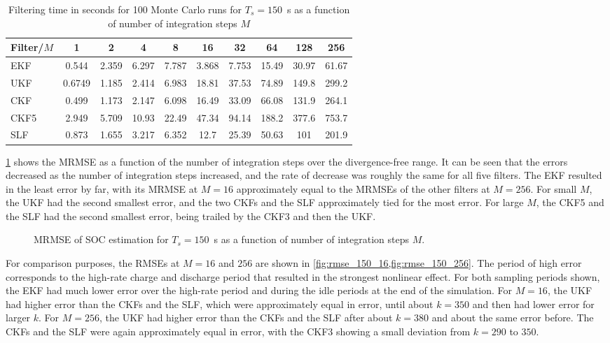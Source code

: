 \documentclass[../zhang_thesis.tex]{subfiles}
\begin{document}
\begin{table}[h]
\centering
\caption{Filtering time in seconds for 100 Monte Carlo runs for $T_s=150$~s as a function of number of integration steps $M$}
\begin{tabular}{@{}lccccccccc@{}}
\toprule
Filter/$M$ & 1      & 2     & 4     & 8     & 16    & 32    & 64    & 128   & 256   \\ \midrule
EKF        & 0.544  & 2.359 & 6.297 & 7.787 & 3.868 & 7.753 & 15.49 & 30.97 & 61.67 \\
UKF        & 0.6749 & 1.185 & 2.414 & 6.983 & 18.81 & 37.53 & 74.89 & 149.8 & 299.2 \\
CKF        & 0.499  & 1.173 & 2.147 & 6.098 & 16.49 & 33.09 & 66.08 & 131.9 & 264.1 \\
CKF5       & 2.949  & 5.709 & 10.93 & 22.49 & 47.34 & 94.14 & 188.2 & 377.6 & 753.7 \\
SLF        & 0.873  & 1.655 & 3.217 & 6.352 & 12.7  & 25.39 & 50.63 & 101   & 201.9 \\ \bottomrule
\end{tabular}
\label{tab:time_150}
\end{table}

\cref{fig:mrmse_150} shows the MRMSE as a function of the number of integration steps over the divergence-free range. It can be seen that the errors decreased as the number of integration steps increased, and the rate of decrease was roughly the same for all five filters. The EKF resulted in the least error by far, with its MRMSE at $M=16$ approximately equal to the MRMSEs of the other filters at $M=256$. For small $M$, the UKF had the second smallest error, and the two CKFs and the SLF
approximately tied for the most error. For large $M$, the CKF5 and the SLF had the second smallest error, being trailed by the CKF3 and then the UKF.

\begin{figure}[ht]
\centering
%
\caption{MRMSE of SOC estimation for $T_s=150$~s as a function of number of integration steps $M$.}
\label{fig:mrmse_150}
\end{figure}

For comparison purposes, the RMSEs at $M=16$ and $256$ are shown in \cref{fig:rmse_150_16,fig:rmse_150_256}. The period of high error corresponds to the high-rate charge and discharge period that resulted in the strongest nonlinear effect. For both sampling periods shown, the EKF had much lower error over the high-rate period and during the idle periods at the end of the simulation. For $M=16$, the UKF had higher error than the CKFs and the SLF, which were approximately equal in error, until about $k=350$ and then had lower error for
larger $k$. For $M=256$, the UKF had higher error than the CKFs and the SLF after about $k=380$ and about the same error before. The CKFs and the SLF were again approximately equal in error, with the CKF3 showing a small deviation from $k=290$ to $350$.
\end{document}
